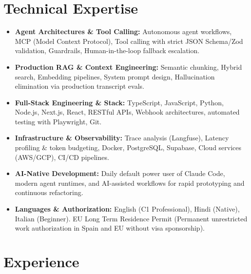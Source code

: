 \documentclass[10pt,a4paper]{article}
\begin{document}
\section{Technical Expertise}
\begin{itemize}
  \item \textbf{Agent Architectures \& Tool Calling:} Autonomous agent workflows, MCP (Model Context Protocol), Tool calling with strict JSON Schema/Zod validation, Guardrails, Human-in-the-loop fallback escalation.
  \item \textbf{Production RAG \& Context Engineering:} Semantic chunking, Hybrid search, Embedding pipelines, System prompt design, Hallucination elimination via production transcript evals.
  \item \textbf{Full-Stack Engineering \& Stack:} TypeScript, JavaScript, Python, Node.js, Next.js, React, RESTful APIs, Webhook architectures, automated testing with Playwright, Git.
  \item \textbf{Infrastructure \& Observability:} Trace analysis (Langfuse), Latency profiling \& token budgeting, Docker, PostgreSQL, Supabase, Cloud services (AWS/GCP), CI/CD pipelines.
  \item \textbf{AI-Native Development:} Daily default power user of Claude Code, modern agent runtimes, and AI-assisted workflows for rapid prototyping and continuous refactoring.
  \item \textbf{Languages \& Authorization:} English (C1 Professional), Hindi (Native), Italian (Beginner). EU Long Term Residence Permit (Permanent unrestricted work authorization in Spain and EU without visa sponsorship).
\end{itemize}

\section{Experience}
\end{document}
